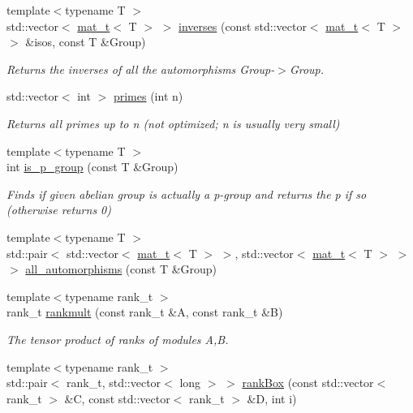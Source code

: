 \begin{DoxyCompactItemize}
{\footnotesize template$<$typename T $>$ }\\std\+::vector$<$ \hyperlink{namespaceMackey_a035386035757dade630f685e508e5cf9}{mat\+\_\+t}$<$ T $>$ $>$ \hyperlink{namespaceMackey_a8c1525b210b4699780bbe05cb16f0e7b}{inverses} (const std\+::vector$<$ \hyperlink{namespaceMackey_a035386035757dade630f685e508e5cf9}{mat\+\_\+t}$<$ T $>$$>$ \&isos, const T \&Group)
\begin{DoxyCompactList}\small\item\em Returns the inverses of all the automorphisms Group-\/$>$Group. \end{DoxyCompactList}\item 
std\+::vector$<$ int $>$ \hyperlink{namespaceMackey_aa136aece9117704b3e5180d92484ed10}{primes} (int n)
\begin{DoxyCompactList}\small\item\em Returns all primes up to n (not optimized; n is usually very small) \end{DoxyCompactList}\item 
{\footnotesize template$<$typename T $>$ }\\int \hyperlink{namespaceMackey_a2b6ac22efe0be546f2c3f8abc2ceb5b7}{is\+\_\+p\+\_\+group} (const T \&Group)
\begin{DoxyCompactList}\small\item\em Finds if given abelian group is actually a p-\/group and returns the p if so (otherwise returns 0) \end{DoxyCompactList}\item 
{\footnotesize template$<$typename T $>$ }\\std\+::pair$<$ std\+::vector$<$ \hyperlink{namespaceMackey_a035386035757dade630f685e508e5cf9}{mat\+\_\+t}$<$ T $>$ $>$, std\+::vector$<$ \hyperlink{namespaceMackey_a035386035757dade630f685e508e5cf9}{mat\+\_\+t}$<$ T $>$ $>$ $>$ \hyperlink{namespaceMackey_a2556e2a1f78783585df78de1c1b35eae}{all\+\_\+automorphisms} (const T \&Group)
\item 
{\footnotesize template$<$typename rank\+\_\+t $>$ }\\rank\+\_\+t \hyperlink{namespaceMackey_aaa0ce7673970bf261628768fb11a1995}{rankmult} (const rank\+\_\+t \&A, const rank\+\_\+t \&B)
\begin{DoxyCompactList}\small\item\em The tensor product of ranks of modules A,B. \end{DoxyCompactList}\item 
{\footnotesize template$<$typename rank\+\_\+t $>$ }\\std\+::pair$<$ rank\+\_\+t, std\+::vector$<$ long $>$ $>$ \hyperlink{namespaceMackey_a8a3b4c6cc908044298e8e287298b9b99}{rank\+Box} (const std\+::vector$<$ rank\+\_\+t $>$ \&C, const std\+::vector$<$ rank\+\_\+t $>$ \&D, int i)
$$
\end{DoxyCompactItemize}
